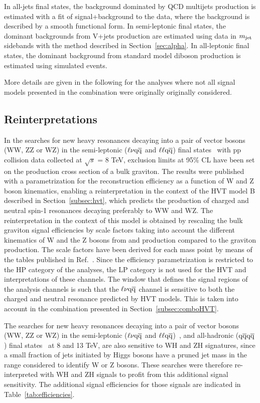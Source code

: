 In all-jets final states, the background dominated by QCD multijets production is estimated with a fit of signal+background to the data, where the background is described by a smooth functional form.
In semi-leptonic final states, the dominant backgrounds from V+jets production are estimated using data in $m_{\text{jet}}$ sidebands with the method described in Section~\ref{sec:alpha}.
In all-leptonic final states, the dominant background from standard model diboson production is estimated using simulated events.

More details are given in the following for the analyses where not all signal models presented in the combination were originally originally considered.

\subsection{Reinterpretations}

In the searches for new heavy resonances decaying into a pair of vector bosons (WW, ZZ or WZ) in the semi-leptonic ($\ell \nu \mathrm{q}\overline{\mathrm{q}}$ and $\ell\ell \mathrm{q}\overline{\mathrm{q}}$) final states~\cite{Khachatryan:2014gha} with pp collision data collected at $\sqrt{s}$ = 8 TeV, exclusion limits at 95\% CL have been set on the production cross section of a bulk graviton.
The results were published with a parametrization for the reconstruction efficiency as a function of W and Z boson kinematics, enabling a reinterpretation in the context of the HVT model B described in Section~\ref{subsec:hvt}, which predicts the production of charged and neutral spin-1 resonances decaying preferably to WW and WZ.
The reinterpretation in the context of this model is obtained by rescaling the bulk graviton signal efficiencies by scale factors taking into account the different kinematics of W and the Z bosons from \PWpr{} and \cPZpr{} production compared to the graviton production.
The scale factors have been derived for each mass point by means of the tables published in Ref.~\cite{Khachatryan:2014gha}.
Since the efficiency parametrization is restricted to the HP category of the analyses, the LP category is not used for the HVT \PWpr{} and \cPZpr{} interpretations of these channels.
The \mJ window that defines the signal regions of the analysis channels is such that the $\ell \nu \mathrm{q}\overline{\mathrm{q}}$ channel is sensitive to both the charged and neutral resonance predicted by HVT models. This is taken into account in the combination presented in Section~\ref{subsec:comboHVT}.

The searches for new heavy resonances decaying into a pair of vector bosons (WW, ZZ or WZ) in the semi-leptonic ($\ell \nu \mathrm{q}\overline{\mathrm{q}}$ and $\ell\ell \mathrm{q}\overline{\mathrm{q}}$)~\cite{Khachatryan:2014gha,Khachatryan:2014gha,CMS-PAS-EXO-15-002}, and all-hadronic ($\mathrm{q}\overline{\mathrm{q}} \mathrm{q}\overline{\mathrm{q}}$) final states~\cite{Khachatryan:2014hpa,CMS-PAS-EXO-15-002} at 8 and 13 TeV, are also sensitive to WH and ZH signatures, since a small fraction of jets initiated by Higgs bosons have a pruned jet mass in the range considered to identify W or Z bosons.
These searches were therefore re-interpreted with WH and ZH signals to profit from this additional signal sensitivity.
The additional signal efficiencies for those signals are indicated in Table~\ref{tab:efficiencies}.

